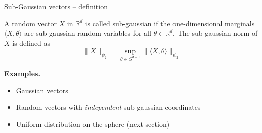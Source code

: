 \documentclass[handout, 10pt]{beamer} %
\begin{document}
  \begin{frame}{Sub-Gaussian vectors -- definition}
    \begin{definition} A random vector $X$ in
      $\mathbb{R}^{d}$ is called sub-gaussian if the one-dimensional marginals
      $\langle X, \theta \rangle$ are sub-gaussian random variables for all $\theta \in \mathbb{R}^{d} .$ The sub-gaussian norm of $X$ is defined as
      $$
      \|X\|_{\psi_{2}}=\sup _{\theta \in S^{d-1}}\|\langle X, \theta\rangle\|_{\psi_{2}}
      $$

    \end{definition}

    \pause

    \textbf{Examples.}
    
    \begin{itemize}
    \item Gaussian vectors
    \item Random vectors with \emph{independent} sub-gaussian coordinates
    \item Uniform distribution on the sphere (next section)
    \end{itemize}
  \end{frame}
\end{document}
